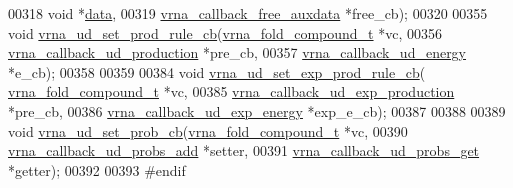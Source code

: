 \begin{DoxyCode}
00318                         \textcolor{keywordtype}{void}                        *\hyperlink{group__domains__up_a8802b1b0512999a9f35202031811ce17}{data},
00319                         \hyperlink{group__fold__compound_ga7806651f51b195013839a218b3bbd5a3}{vrna\_callback\_free\_auxdata}  *free\_cb);
00320 
00355 \textcolor{keywordtype}{void} \hyperlink{group__domains__up_ga745a99f0bc72898d54de16f6e538828a}{vrna\_ud\_set\_prod\_rule\_cb}(\hyperlink{group__fold__compound_structvrna__fc__s}{vrna\_fold\_compound\_t}        *vc,
00356                               \hyperlink{group__domains__up_ga4fdfc02c1b660c07f2d887772f02a0a1}{vrna\_callback\_ud\_production} *pre\_cb,
00357                               \hyperlink{group__domains__up_ga75825c57d0bfde4ae4f95c044260c5c3}{vrna\_callback\_ud\_energy}     *e\_cb);
00358 
00359 
00384 \textcolor{keywordtype}{void}  \hyperlink{group__domains__up_ga2fb1db2099da26c76247e1209ad4aa09}{vrna\_ud\_set\_exp\_prod\_rule\_cb}( 
      \hyperlink{group__fold__compound_structvrna__fc__s}{vrna\_fold\_compound\_t}            *vc,
00385                                     \hyperlink{group__domains__up_ga33d78327dcd04c1ca5ab2887edc18c7b}{vrna\_callback\_ud\_exp\_production} *pre\_cb,
00386                                     \hyperlink{group__domains__up_ga861706f257ba993753464b823e65b86e}{vrna\_callback\_ud\_exp\_energy}     *exp\_e\_cb);
00387 
00388 
00389 \textcolor{keywordtype}{void}  \hyperlink{unstructured__domains_8h_a13ac877c9db89a1a5b5d9c0394148595}{vrna\_ud\_set\_prob\_cb}(\hyperlink{group__fold__compound_structvrna__fc__s}{vrna\_fold\_compound\_t}        *vc,
00390                           \hyperlink{group__domains__up_gab10498abc84fcaf336aca8f8d7d42eb2}{vrna\_callback\_ud\_probs\_add}  *setter,
00391                           \hyperlink{group__domains__up_gaa10ba1b6f1e179ea84c5caca9cdaae67}{vrna\_callback\_ud\_probs\_get}  *getter);
00392 
00393 \textcolor{preprocessor}{#endif}
\end{DoxyCode}
